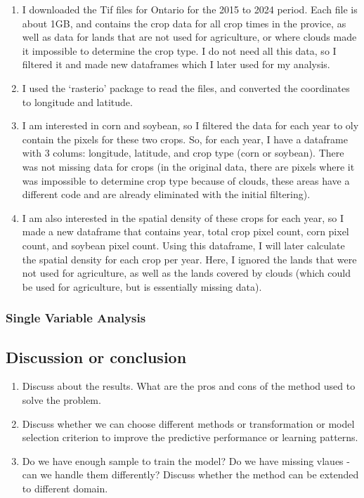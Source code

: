 \documentclass[
  11pt,
  letterpaper,
  DIV=11,
  numbers=noendperiod]{scrartcl}
\providecommand{\tightlist}{%
  \setlength{\itemsep}{0pt}\setlength{\parskip}{0pt}}
\begin{document}
\begin{enumerate}
\def\labelenumi{\arabic{enumi}.}
\tightlist
\item
  I downloaded the Tif files for Ontario for the 2015 to 2024 period.
  Each file is about 1GB, and contains the crop data for all crop times
  in the provice, as well as data for lands that are not used for
  agriculture, or where clouds made it impossible to determine the crop
  type. I do not need all this data, so I filtered it and made new
  dataframes which I later used for my analysis.
\item
  I used the `rasterio' package to read the files, and converted the
  coordinates to longitude and latitude.
\item
  I am interested in corn and soybean, so I filtered the data for each
  year to oly contain the pixels for these two crops. So, for each year,
  I have a dataframe with 3 colums: longitude, latitude, and crop type
  (corn or soybean). There was not missing data for crops (in the
  original data, there are pixels where it was impossible to determine
  crop type because of clouds, these areas have a different code and are
  already eliminated with the initial filtering).
\item
  I am also interested in the spatial density of these crops for each
  year, so I made a new dataframe that contains year, total crop pixel
  count, corn pixel count, and soybean pixel count. Using this
  dataframe, I will later calculate the spatial density for each crop
  per year. Here, I ignored the lands that were not used for
  agriculture, as well as the lands covered by clouds (which could be
  used for agriculture, but is essentially missing data).
\end{enumerate}

\subsubsection{Single Variable Analysis}\label{single-variable-analysis}

\subsection{Discussion or conclusion}\label{discussion-or-conclusion}

\begin{enumerate}
\def\labelenumi{\arabic{enumi}.}
\item
  Discuss about the results. What are the pros and cons of the method
  used to solve the problem.
\item
  Discuss whether we can choose different methods or transformation or
  model selection criterion to improve the predictive performance or
  learning patterns.
\item
  Do we have enough sample to train the model? Do we have missing vlaues
  - can we handle them differently? Discuss whether the method can be
  extended to different domain.
\end{enumerate}
\end{document}
